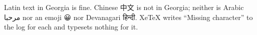 \documentclass{article}
\begin{document}
Latin text in Georgia is fine. Chinese 中文 is not in Georgia; neither is Arabic
مرحبا nor an emoji 😀 nor Devanagari हिन्दी. XeTeX writes ``Missing character'' to the log
for each and typesets nothing for it.
\end{document}
